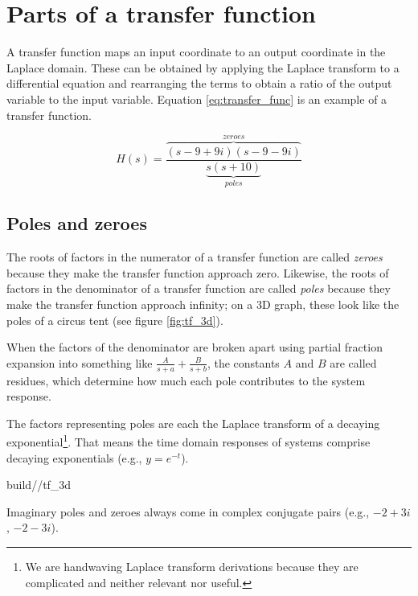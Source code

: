 \section{Parts of a transfer function}

A transfer function maps an input coordinate to an output coordinate in the
Laplace domain. These can be obtained by applying the Laplace transform to a
differential equation and rearranging the terms to obtain a ratio of the output
variable to the input variable. Equation \eqref{eq:transfer_func} is an example
of a transfer function.

\begin{equation} \label{eq:transfer_func}
  H(s) = \frac{\overbrace{(s-9+9i)(s-9-9i)}^{zeroes}}
    {\underbrace{s(s+10)}_{poles}}
\end{equation}

\subsection{Poles and zeroes}

The roots of factors in the numerator of a transfer function are called
\textit{zeroes} because they make the transfer function approach zero. Likewise,
the roots of factors in the denominator of a transfer function are called
\textit{poles} because they make the transfer function approach infinity; on a
3D graph, these look like the poles of a circus tent (see figure
\ref{fig:tf_3d}).

When the factors of the denominator are broken apart using partial fraction
expansion into something like $\frac{A}{s + a} + \frac{B}{s + b}$, the constants
$A$ and $B$ are called residues, which determine how much each pole contributes
to the \gls{system response}.

The factors representing poles are each the Laplace transform of a decaying
exponential\footnote{We are handwaving Laplace transform derivations because
they are complicated and neither relevant nor useful.}. That means the time
domain responses of \glspl{system} comprise decaying exponentials (e.g.,
$y = e^{-t}$).

\begin{svg}{build/\chapterpath/tf_3d}
  \caption{Equation \eqref{eq:transfer_func} plotted in 3D}
  \label{fig:tf_3d}
\end{svg}

\begin{remark}
  Imaginary poles and zeroes always come in complex conjugate pairs (e.g.,
  $-2 + 3i$, $-2 - 3i$).
\end{remark}

